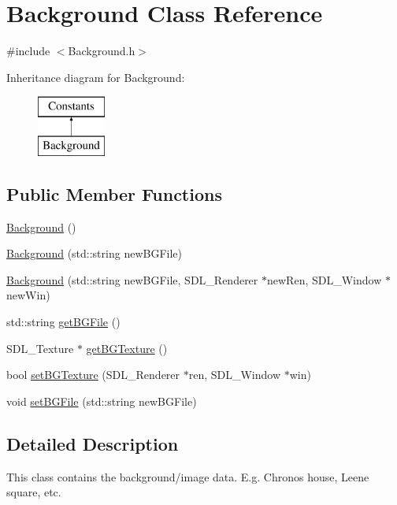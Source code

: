 \hypertarget{classBackground}{}\section{Background Class Reference}
\label{classBackground}


{\ttfamily \#include $<$Background.\+h$>$}

Inheritance diagram for Background\+:\begin{figure}[H]
\begin{center}
\leavevmode
\includegraphics[height=2.000000cm]{classBackground}
\end{center}
\end{figure}
\subsection*{Public Member Functions}
\begin{DoxyCompactItemize}
\item 
\hyperlink{classBackground_a05b686e4ce0cbdb3b1fa14a93fdf98a1}{Background} ()
\item 
\hyperlink{classBackground_a40a6b9d526e79ddf5fc2d0201f17b540}{Background} (std\+::string new\+B\+G\+File)
\item 
\hyperlink{classBackground_aedede892eac3a2e2b9a2bf6191e80217}{Background} (std\+::string new\+B\+G\+File, S\+D\+L\+\_\+\+Renderer $\ast$new\+Ren, S\+D\+L\+\_\+\+Window $\ast$new\+Win)
\item 
std\+::string \hyperlink{classBackground_af76fb5926c3c73dc82090795e094252d}{get\+B\+G\+File} ()
\item 
S\+D\+L\+\_\+\+Texture $\ast$ \hyperlink{classBackground_ad155a21be25b01e6dfc4d5aa3592570e}{get\+B\+G\+Texture} ()
\item 
bool \hyperlink{classBackground_ad2d7cd387529a4257802dcb4235ff3ff}{set\+B\+G\+Texture} (S\+D\+L\+\_\+\+Renderer $\ast$ren, S\+D\+L\+\_\+\+Window $\ast$win)
\item 
void \hyperlink{classBackground_a52f039c01025184caaab3886dc591be6}{set\+B\+G\+File} (std\+::string new\+B\+G\+File)
\end{DoxyCompactItemize}


\subsection{Detailed Description}
This class contains the background/image data. E.\+g. Chrono\textquotesingle{}s house, Leene square, etc. 

